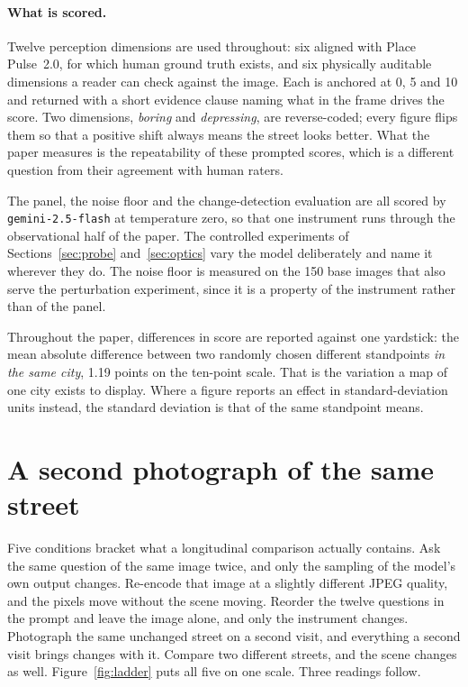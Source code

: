 \paragraph{What is scored.}
Twelve perception dimensions are used throughout: six aligned with Place
Pulse~2.0, for which human ground truth exists, and six physically auditable
dimensions a reader can check against the image. Each is anchored at 0, 5 and 10
and returned with a short evidence clause naming what in the frame drives the
score. Two dimensions, \emph{boring} and \emph{depressing}, are reverse-coded;
every figure flips them so that a positive shift always means the street looks
better. What the paper measures is the repeatability of these prompted scores,
which is a different question from their agreement with human raters.

The panel, the noise floor and the change-detection evaluation are all scored by
\texttt{gemini-2.5-flash} at temperature zero, so that one instrument runs
through the observational half of the paper. The controlled experiments of
Sections~\ref{sec:probe} and~\ref{sec:optics} vary the model deliberately and
name it wherever they do. The noise floor is measured on the 150 base images
that also serve the perturbation experiment, since it is a property of the
instrument rather than of the panel.

Throughout the paper, differences in score are reported against one yardstick:
the mean absolute difference between two randomly chosen different standpoints
\emph{in the same city}, 1.19 points on the ten-point scale. That is the
variation a map of one city exists to display. Where a figure reports an effect
in standard-deviation units instead, the standard deviation is that of the same
standpoint means.

\section{A second photograph of the same street}
\label{sec:ladder}

Five conditions bracket what a longitudinal comparison actually contains. Ask
the same question of the same image twice, and only the sampling of the model's
own output changes. Re-encode that image at a slightly different JPEG quality,
and the pixels move without the scene moving. Reorder the twelve questions in
the prompt and leave the image alone, and only the instrument changes.
Photograph the same unchanged street on a second visit, and everything a second
visit brings changes with it. Compare two different streets, and the scene
changes as well. Figure~\ref{fig:ladder} puts all five on one scale. Three
readings follow.

